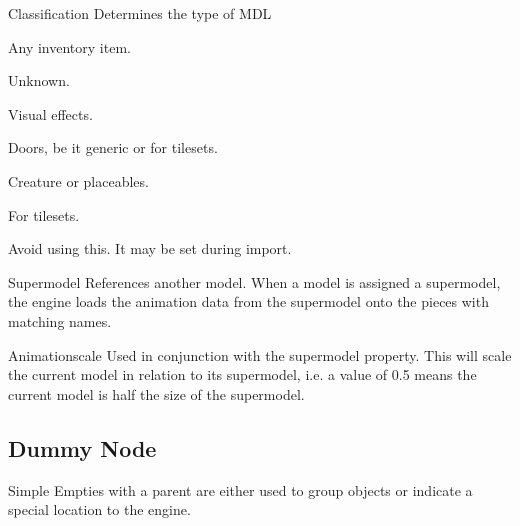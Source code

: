 \begin{propertyAurora}{Classification}
Determines the type of MDL
\begin{description}[leftmargin=6em,style=nextline]
    \item[Item] Any inventory item.
    \item[GUI] Unknown.
    \item[Effect] Visual effects.
    \item[Door] Doors, be it generic or for tilesets.
    \item[Character] Creature or placeables. 
    \item[Tile] For tilesets.
    \item[Unknown] Avoid using this. It may be set during import.
\end{description}
\end{propertyAurora}

\begin{propertyAurora}{Supermodel}
References another model. When a model is assigned a supermodel, 
the engine loads the animation data from the supermodel onto the 
pieces with matching names.
\end{propertyAurora}

\begin{propertyAurora}{Animationscale}
Used in conjunction with the supermodel property. This will scale the current model in relation to 
its supermodel, i.e. a value of 0.5 means the current model is half the size of the supermodel.
\end{propertyAurora}

\subsection{Dummy Node}
Simple Empties with a parent are either used to group objects or
indicate a special location to the engine. \\

